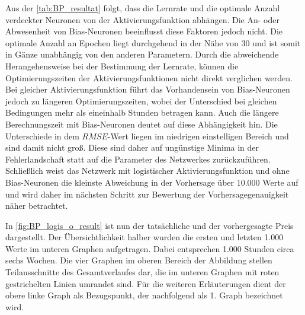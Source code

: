 Aus der \autoref{tab:BP_resultat} folgt, dass die Lernrate und die optimale Anzahl verdeckter Neuronen von der Aktivierungsfunktion abhängen. Die An- oder Abwesenheit von Bias-Neuronen beeinflusst diese Faktoren jedoch nicht. Die optimale Anzahl an Epochen liegt durchgehend in der Nähe von 30 und ist somit in Gänze unabhängig von den anderen Parametern. Durch die abweichende Herangehensweise bei der Bestimmung der Lernrate, können die Optimierungszeiten der Aktivierungsfunktionen nicht direkt verglichen werden. Bei gleicher Aktivierungsfunktion führt das Vorhandensein von Bias-Neuronen jedoch zu längeren Optimierungszeiten, wobei der Unterschied bei gleichen Bedingungen mehr als eineinhalb Stunden betragen kann. Auch die längere Berechnungszeit mit Bias-Neuronen deutet auf diese Abhängigkeit hin. Die Unterschiede in dem $RMSE$-Wert liegen im niedrigen einstelligen Bereich und sind damit nicht groß. Diese sind daher auf ungünstige Minima in der Fehlerlandschaft statt auf die Parameter des Netzwerkes zurückzuführen. Schließlich weist das Netzwerk mit logistischer Aktivierungsfunktion und ohne Bias-Neuronen die kleinste Abweichung in der Vorhersage über 10.000 Werte auf und wird daher im nächsten Schritt zur Bewertung der Vorhersagegenauigkeit näher betrachtet.

In \autoref{fig:BP_logis_o_result} ist nun der tatsächliche und der vorhergesagte Preis dargestellt. Der Übersichtlichkeit halber wurden die ersten und letzten 1.000 Werte im unteren Graphen aufgetragen. Dabei entsprechen 1.000 Stunden circa sechs Wochen. Die vier Graphen im oberen Bereich der Abbildung stellen Teilausschnitte des Gesamtverlaufes dar, die im unteren Graphen mit roten gestrichelten Linien umrandet sind. Für die weiteren Erläuterungen dient der obere linke Graph als Bezugspunkt, der nachfolgend als 1. Graph bezeichnet wird.



\begin{figure}[!htb]
    \centering
        
    \caption{}
    \label{fig:BP_logis_o_result}
\end{figure}

